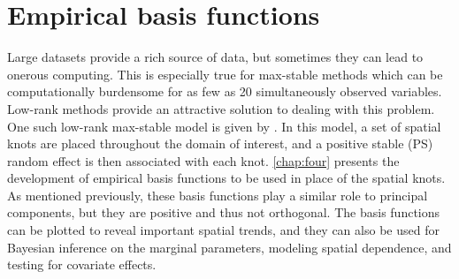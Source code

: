 \section{Empirical basis functions}
Large datasets provide a rich source of data, but sometimes they can lead to onerous computing.
This is especially true for max-stable methods which can be computationally burdensome for as few as 20 simultaneously observed variables.
Low-rank methods provide an attractive solution to dealing with this problem.
One such low-rank max-stable model is given by \citet{Reich2012}.
In this model, a set of spatial knots are placed throughout the domain of interest, and a positive stable (PS) random effect is then associated with each knot.
\cref{chap:four} presents the development of empirical basis functions to be used in place of the spatial knots.
As mentioned previously, these basis functions play a similar role to principal components, but they are positive and thus not orthogonal.
The basis functions can be plotted to reveal important spatial trends, and they can also be used for Bayesian inference on the marginal parameters, modeling spatial dependence, and testing for covariate effects.
